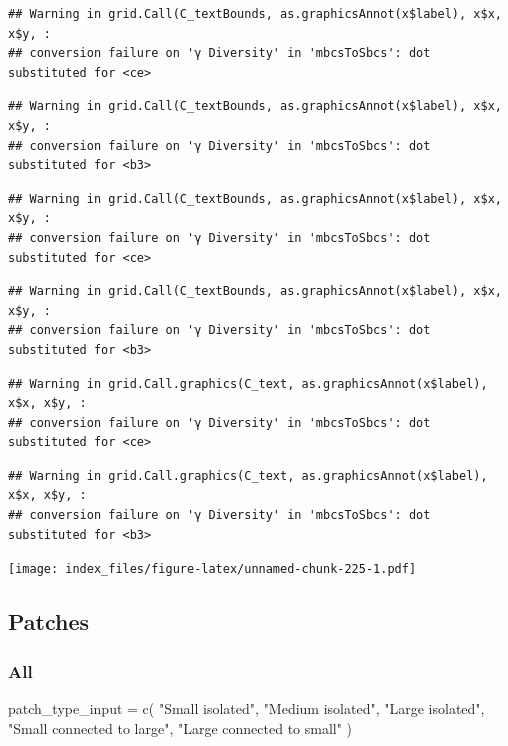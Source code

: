 \documentclass[
]{article}
\newenvironment{Shaded}{\begin{snugshade}}{\end{snugshade}}
\newcommand{\FunctionTok}[1]{\textcolor[rgb]{0.00,0.00,0.00}{#1}}
\newcommand{\NormalTok}[1]{#1}
\newcommand{\OtherTok}[1]{\textcolor[rgb]{0.56,0.35,0.01}{#1}}
\newcommand{\StringTok}[1]{\textcolor[rgb]{0.31,0.60,0.02}{#1}}
\begin{document}
\begin{verbatim}
## Warning in grid.Call(C_textBounds, as.graphicsAnnot(x$label), x$x, x$y, :
## conversion failure on 'γ Diversity' in 'mbcsToSbcs': dot substituted for <ce>
\end{verbatim}

\begin{verbatim}
## Warning in grid.Call(C_textBounds, as.graphicsAnnot(x$label), x$x, x$y, :
## conversion failure on 'γ Diversity' in 'mbcsToSbcs': dot substituted for <b3>
\end{verbatim}

\begin{verbatim}
## Warning in grid.Call(C_textBounds, as.graphicsAnnot(x$label), x$x, x$y, :
## conversion failure on 'γ Diversity' in 'mbcsToSbcs': dot substituted for <ce>
\end{verbatim}

\begin{verbatim}
## Warning in grid.Call(C_textBounds, as.graphicsAnnot(x$label), x$x, x$y, :
## conversion failure on 'γ Diversity' in 'mbcsToSbcs': dot substituted for <b3>
\end{verbatim}

\begin{verbatim}
## Warning in grid.Call.graphics(C_text, as.graphicsAnnot(x$label), x$x, x$y, :
## conversion failure on 'γ Diversity' in 'mbcsToSbcs': dot substituted for <ce>
\end{verbatim}

\begin{verbatim}
## Warning in grid.Call.graphics(C_text, as.graphicsAnnot(x$label), x$x, x$y, :
## conversion failure on 'γ Diversity' in 'mbcsToSbcs': dot substituted for <b3>
\end{verbatim}

\texttt{[image: index\_files/figure-latex/unnamed-chunk-225-1.pdf]}

\hypertarget{patches}{%
\subsection{Patches}\label{patches}}

\hypertarget{all-1}{%
\subsubsection{All}\label{all-1}}

\begin{Shaded}
\begin{Highlighting}[]
\NormalTok{patch\_type\_input }\OtherTok{=} \FunctionTok{c}\NormalTok{(}
      \StringTok{"Small isolated"}\NormalTok{,}
      \StringTok{"Medium isolated"}\NormalTok{,}
      \StringTok{"Large isolated"}\NormalTok{,}
      \StringTok{"Small connected to large"}\NormalTok{,}
      \StringTok{"Large connected to small"}
\NormalTok{    )}
\end{Highlighting}
\end{Shaded}
\end{document}
